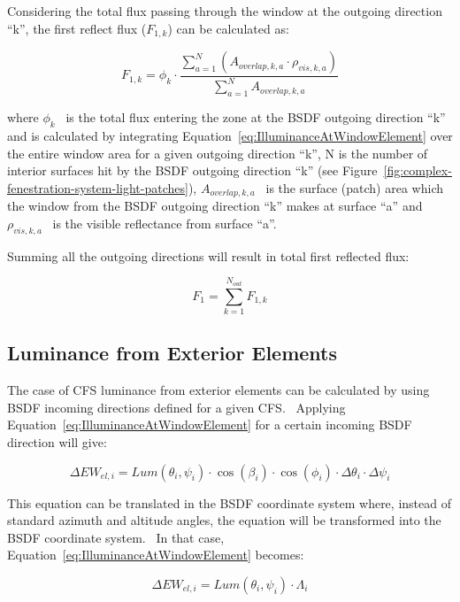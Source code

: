 Considering the total flux passing through the window at the outgoing direction ``k'', the first reflect flux (\({F_{1,k}}\)) can be calculated as:

\begin{equation}
{F_{1,k}} = {\phi_k} \cdot \frac{{\sum\limits_{a = 1}^N {({A_{overlap,k,a}} \cdot {\rho_{vis,k,a}})} }}{{\sum\limits_{a = 1}^N {{A_{overlap,k,a}}} }}
\end{equation}

where \({\phi_k}\) ~is the total flux entering the zone at the BSDF outgoing direction ``k'' and is calculated by integrating Equation~\ref{eq:IlluminanceAtWindowElement} over the entire window area for a given outgoing direction ``k'', N is the number of interior surfaces hit by the BSDF outgoing direction ``k'' (see Figure~\ref{fig:complex-fenestration-system-light-patches}), \({A_{overlap,k,a}}\) ~is the surface (patch) area which the window from the BSDF outgoing direction ``k'' makes at surface ``a'' and \({\rho_{vis,k,a}}\) ~is the visible reflectance from surface ``a''.

Summing all the outgoing directions will result in total first reflected flux:

\begin{equation}
{F_1} = \sum\limits_{k = 1}^{{N_{out}}} {{F_{1,k}}}
\end{equation}

\subsection{Luminance from Exterior Elements}\label{luminance-from-exterior-elements}

The case of CFS luminance from exterior elements can be calculated by using BSDF incoming directions defined for a given CFS.~ Applying Equation~\ref{eq:IlluminanceAtWindowElement} for a certain incoming BSDF direction will give:

\begin{equation}
\Delta E{W_{el,i}} = Lum({\theta_i},{\psi_i}) \cdot \cos ({\beta_i}) \cdot \cos ({\phi_i}) \cdot \Delta {\theta_i} \cdot \Delta {\psi_i}
\end{equation}

This equation can be translated in the BSDF coordinate system where, instead of standard azimuth and altitude angles, the equation will be transformed into the BSDF coordinate system.~ In that case, Equation~\ref{eq:IlluminanceAtWindowElement} becomes:

\begin{equation}
\Delta E{W_{el,i}} = Lum({\theta_i},{\psi_i}) \cdot {\Lambda_i}
\end{equation}

